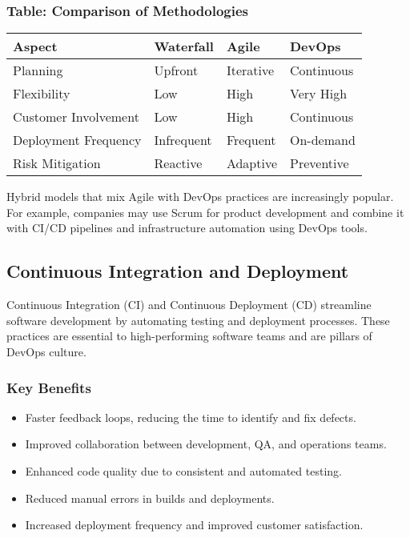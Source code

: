 \subsubsection*{Table: Comparison of Methodologies}
\begin{tabular}{|l|l|l|l|}
    \hline
    \textbf{Aspect}      & \textbf{Waterfall} & \textbf{Agile} & \textbf{DevOps} \\
    \hline
    Planning             & Upfront            & Iterative      & Continuous      \\
    \hline
    Flexibility          & Low                & High           & Very High       \\
    \hline
    Customer Involvement & Low                & High           & Continuous      \\
    \hline
    Deployment Frequency & Infrequent         & Frequent       & On-demand       \\
    \hline
    Risk Mitigation      & Reactive           & Adaptive       & Preventive      \\
    \hline
\end{tabular}


Hybrid models that mix Agile with DevOps practices are increasingly popular. For example, companies may use Scrum for product development and combine it with CI/CD pipelines and infrastructure automation using DevOps tools.

\subsection{Continuous Integration and Deployment}
Continuous Integration (CI) and Continuous Deployment (CD) streamline software development by automating testing and deployment processes. These practices are essential to high-performing software teams and are pillars of DevOps culture.

\subsubsection*{Key Benefits}
\begin{itemize}
    \item Faster feedback loops, reducing the time to identify and fix defects.
    \item Improved collaboration between development, QA, and operations teams.
    \item Enhanced code quality due to consistent and automated testing.
    \item Reduced manual errors in builds and deployments.
    \item Increased deployment frequency and improved customer satisfaction.
\end{itemize}

